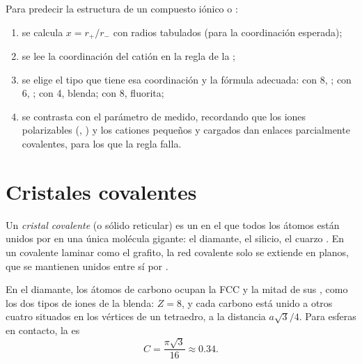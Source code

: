 \begin{method}\label{met:b1:crystals-ionic-covalent:predict}
Para predecir la estructura de un compuesto iónico  o :
\begin{enumerate}
  \item se calcula $x = r_+/r_-$ con radios tabulados (para la
        coordinación esperada);
  \item se lee la coordinación del catión en la regla de la ;
  \item se elige el tipo que tiene esa coordinación y la fórmula
        adecuada:  con 8, ; con 6, ; con 4,
        blenda;  con 8, fluorita;
  \item se contrasta con el parámetro de  medido, recordando que los
        iones polarizables (, ) y los cationes pequeños
        y cargados dan enlaces parcialmente covalentes, para los que la
        regla falla.
\end{enumerate}
\end{method}

\section{Cristales covalentes}

\begin{definition}\label{def:b1:crystals-ionic-covalent:covalent-crystal}
Un \emph{cristal covalente} (o sólido reticular)
es un  en el que todos los átomos están unidos por  en una única molécula gigante: el diamante, el silicio, el
cuarzo . En un  covalente laminar como el grafito, la red
covalente solo se extiende en planos, que se mantienen unidos entre sí
por .
\end{definition}

\begin{proposition}\label{prop:b1:crystals-ionic-covalent:diamond}
En el diamante, los átomos de carbono ocupan la  FCC y la mitad de sus
, como los dos tipos de iones de la blenda: $Z = 8$, y
cada carbono está unido a otros cuatro situados en los vértices de un
tetraedro, a la distancia $a\sqrt3/4$. Para esferas en contacto, la
 es
\[
  C = \frac{\pi\sqrt3}{16} \approx 0.34 .
\]
\end{proposition}

